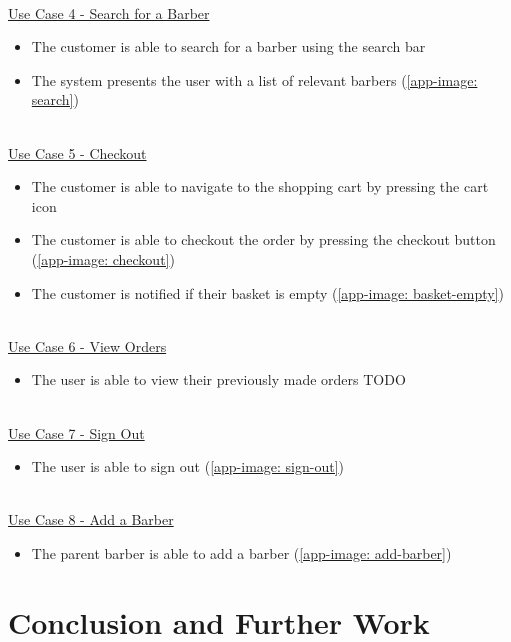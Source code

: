 \documentclass[12pt]{article}
\begin{document}
	\noindent
	\\
	\underline{Use Case 4 - Search for a Barber}
	
	\begin{itemize}
		\item The customer is able to search for a barber using the search bar
		\item The system presents the user with a list of relevant barbers (\autoref{app-image: search})
	\end{itemize}
	
	\noindent
	\\
	\underline{Use Case 5 - Checkout}
	
	\begin{itemize}
		\item The customer is able to navigate to the shopping cart by pressing the cart icon
		\item The customer is able to checkout the order by pressing the checkout button (\autoref{app-image: checkout})
		\item The customer is notified if their basket is empty (\autoref{app-image: basket-empty})
	\end{itemize}
	
	\noindent
	\\	
	\underline{Use Case 6 - View Orders}
	
	\begin{itemize}
		\item The user is able to view their previously made orders TODO
	\end{itemize}
	
	\noindent
	\\
	\underline{Use Case 7 - Sign Out}
	
	\begin{itemize}
		\item The user is able to sign out (\autoref{app-image: sign-out})
	\end{itemize}
	
	\noindent
	\\
	\underline{Use Case 8 - Add a Barber}
	
	\begin{itemize}
		\item The parent barber is able to add a barber (\autoref{app-image: add-barber})
	\end{itemize}
	
	
	\section{Conclusion and Further Work}
	
\end{document}

